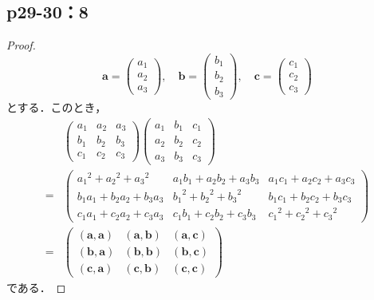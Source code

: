 \documentclass[uplatex,dvipdfmx,a4paper,11pt,fleqn]{jsarticle}
\begin{document}
\subsection*{p29-30：8}
\begin{tleftbar}
    \begin{proof}
    \[
    \bm{a}=\begin{pmatrix} a_1 \\ a_2 \\ a_3 \end{pmatrix},\quad \bm{b}=\begin{pmatrix} b_1 \\ b_2 \\ b_3 \end{pmatrix},\quad \bm{c}=\begin{pmatrix} c_1 \\ c_2 \\ c_3 \end{pmatrix}
    \]
    とする．このとき，
    \begin{align*}
        &
        \begin{pmatrix}
            a_1 & a_2 & a_3 \\
            b_1 & b_2 & b_3 \\
            c_1 & c_2 & c_3
        \end{pmatrix}
        \begin{pmatrix}
            a_1 & b_1 & c_1 \\
            a_2 & b_2 & c_2 \\
            a_3 & b_3 & c_3
        \end{pmatrix}
        \\
         =& \begin{pmatrix}
            {a_1}^2 +{a_2}^2 +{a_3}^2 & a_1 b_1 + a_2 b_2 + a_3 b_3 & a_1 c_1 + a_2 c_2 + a_3 c_3 \\
            b_1 a_1 + b_2 a_2 + b_3 a_3 & {b_1}^2 +{b_2}^2 + {b_3}^2 & b_1 c_1 + b_2 c_2 + b_3 c_3 \\
            c_1 a_1 + c_2 a_2 + c_3 a_3 & c_1 b_1 + c_2 b_2 + c_3 b_3 & {c_1}^2 +{c_2}^2 +{c_3}^2
        \end{pmatrix}
        \\
        =& \begin{pmatrix}
            (\bm{a},\bm{a}) & (\bm{a},\bm{b}) & (\bm{a},\bm{c}) \\
            (\bm{b},\bm{a}) & (\bm{b},\bm{b}) & (\bm{b},\bm{c}) \\
            (\bm{c},\bm{a}) & (\bm{c},\bm{b}) & (\bm{c},\bm{c})
        \end{pmatrix}
    \end{align*}
    である．


\end{proof}
\end{tleftbar}
\end{document}
